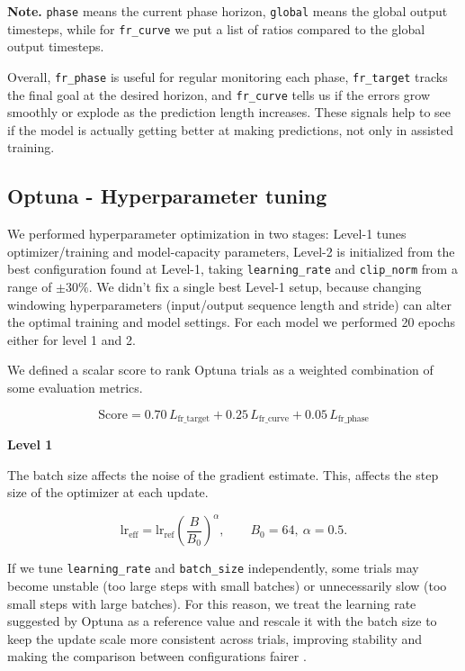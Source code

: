 \noindent\textbf{Note.} \texttt{phase} means the current phase horizon, \texttt{global} means the global output timesteps, while for \texttt{fr\_curve} we put a list of ratios compared to the global output timesteps.

\vspace{1em}

Overall, \texttt{fr\_phase} is useful for regular monitoring each phase, \texttt{fr\_target} tracks the final goal at the desired horizon, and \texttt{fr\_curve} tells us if the errors grow smoothly or explode as the prediction length increases. These signals help to see if the model is actually getting better at making predictions, not only in assisted training.

\subsection{Optuna - Hyperparameter tuning}
\label{sec:hyper}

We performed hyperparameter optimization in two stages: Level-1 tunes optimizer/training and model-capacity parameters, Level-2 is initialized from the best configuration found at Level-1, taking \texttt{learning\_rate} and \texttt{clip\_norm} from a range of $\pm 30\%$. We didn't fix a single best Level-1 setup, because changing windowing hyperparameters (input/output sequence length and stride) can alter the optimal training and model settings. For each model we performed 20 epochs either for level 1 and 2.

We defined a scalar score to rank Optuna trials as a weighted combination of some evaluation metrics.

\begin{equation}
\text{Score}
= 0.70\,L_{\text{fr\_target}}
+ 0.25\,L_{\text{fr\_curve}}
+ 0.05\,L_{\text{fr\_phase}}
\end{equation}

\textbf{Level 1}




The batch size affects the noise of the gradient estimate.
This, affects the step size of the optimizer at each update. 

\begin{equation}
\mathrm{lr}_{\mathrm{eff}}=\mathrm{lr}_{\mathrm{ref}}\left(\frac{B}{B_0}\right)^{\alpha},
\qquad B_0=64,\ \alpha=0.5.
\end{equation}

If we tune \texttt{learning\_rate} and \texttt{batch\_size} independently, some trials may become unstable (too large steps with small batches) or unnecessarily slow (too small steps with large batches). 
For this reason, we treat the learning rate suggested by Optuna as a reference value and rescale it with the batch size to keep the update scale more consistent across trials, improving stability and making the comparison between configurations fairer \cite{goyal2017largeminibatch}.

